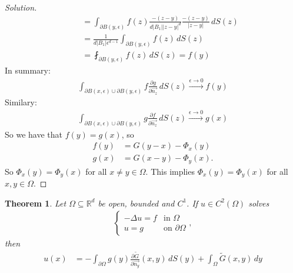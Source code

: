 \documentclass{report}
\theoremstyle{tommy}
\newtheorem{thm}[defn]{Theorem}
\begin{document}
\begin{proof}[Solution]
\begin{align*}
      &\quad= \int_{\partial B(y, \epsilon)} f(z) \frac{-(z-y)}{d |B_1||z-y|^d} \frac{-(z-y)}{|z-y|} \, dS(z) \\
      &\quad = \frac{1}{d|B_1|\epsilon^{d-1}} \int_{\partial B(y,\epsilon)} f(z) \, dS(z) \\
      &\quad= \fint_{\partial B(y,\epsilon)} f(z) \, dS(z) = f(y)
    \end{align*}
    In summary:
    \begin{align*}
      \int_{\partial B(x, \epsilon) \cup \partial B(y,\epsilon)} f \frac{\partial g}{\partial \vec{n_z}} \, dS(z) \xrightarrow{\epsilon \to 0} f(y)
    \end{align*}
    Similary:
    \begin{align*}
      \int_{\partial B(x,\epsilon) \cup \partial B(y, \epsilon)} g \frac{\partial f}{\partial \vec{n_z}} \, dS(z) \xrightarrow{\epsilon \to 0} g(x)
    \end{align*}
    So we have that \(f(y) = g(x)\), so \begin{align*}
      f(y) &= G(y-x) - \Phi_x(y) \\
      g(x) &= G(x-y) - \Phi_y(x).
    \end{align*}
    So \(\Phi_x(y) = \Phi_y(x)\) for all \(x \ne y \in \Omega\). This implies \(\Phi_x(y) = \Phi_y(x)\) for all \(x,y \in \Omega\).
  \end{proof}
  
  
  \begin{thm}
    Let \(\Omega \subseteq \mathbb{R}^d\) be open, bounded and \(C^1\). If \(u \in C^2(\Omega)\) solves 
    \begin{align*}
      \begin{cases}
        - \Delta u = f & \text{in } \Omega \\
        u = g & \text{on } \partial \Omega
      \end{cases},
    \end{align*}
    then 
    \begin{align*}
      u(x)
      &= - \int_{\partial \Omega} g(y) \frac{\partial \tilde G}{\partial \vec{n_y}}(x,y) \, dS(y) + \int_{\Omega} \tilde G(x,y) \, dy    \end{align*}
  \end{thm}
\end{document}
